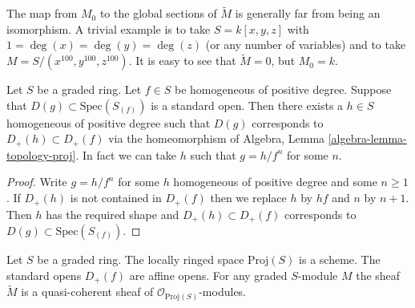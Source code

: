 \begin{remark}
\label{remark-global-sections-not-isomorphism}
The map from $M_0$ to the global sections of $\widetilde M$
is generally far from being an isomorphism. A trivial
example is to take $S = k[x, y, z]$ with $1 = \deg(x) = \deg(y) = \deg(z)$
(or any number of variables) and to take $M = S/(x^{100}, y^{100}, z^{100})$.
It is easy to see that $\widetilde M = 0$, but $M_0 = k$.
\end{remark}

\begin{lemma}
\label{lemma-standard-open-proj}
Let $S$ be a graded ring. Let $f \in S$ be homogeneous of positive degree.
Suppose that $D(g) \subset \text{Spec}(S_{(f)})$ is a standard open.
Then there exists a $h \in S$ homogeneous of positive degree such that
$D(g)$ corresponds to $D_{+}(h) \subset D_{+}(f)$ via the homeomorphism
of Algebra, Lemma \ref{algebra-lemma-topology-proj}. In fact we can
take $h$ such that $g = h/f^n$ for some $n$.
\end{lemma}

\begin{proof}
Write $g = h/f^n$ for some $h$ homogeneous of positive degree
and some $n \geq 1$. If $D_{+}(h)$ is not contained in
$D_{+}(f)$ then we replace $h$ by $hf$ and $n$ by $n + 1$.
Then $h$ has the required shape and $D_{+}(h) \subset D_{+}(f)$
corresponds to $D(g) \subset \text{Spec}(S_{(f)})$.
\end{proof}

\begin{lemma}
\label{lemma-proj-scheme}
Let $S$ be a graded ring.
The locally ringed space $\text{Proj}(S)$ is a scheme.
The standard opens $D_{+}(f)$ are affine opens.
For any graded $S$-module $M$ the sheaf
$\widetilde M$ is a quasi-coherent sheaf of
$\mathcal{O}_{\text{Proj}(S)}$-modules.
\end{lemma}

